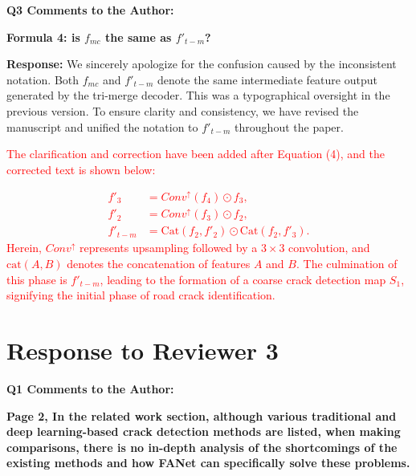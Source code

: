 \documentclass[lettersize,journal,onecolumn,12pt]{IEEEtran}
\begin{document}
{\color{BlueGreen} \textbf{Q3 Comments to the Author:}

\textbf{Formula 4: is $f_{mc}$ the same as $f'_{t-m}$?}} 

\textbf{Response:}
We sincerely apologize for the confusion caused by the inconsistent notation. 
Both $f_{mc}$ and $f'_{t-m}$ denote the same intermediate feature output generated by the tri-merge decoder. 
This was a typographical oversight in the previous version. 
To ensure clarity and consistency, we have revised the manuscript and unified the notation to $f'_{t-m}$ throughout the paper. 

\textcolor{red}{The clarification and correction have been added after Equation (4), and the corrected text is shown below:}

\textcolor{red}{
\begin{equation}
\begin{split}
    f'_3 &= Conv^ {\uparrow }(f_4)   \odot f_3, \\
    f'_2 &= Conv^ {\uparrow }(f_3)   \odot f_2, \\
    f'_{t-m} &= \text{Cat}(f_2,f'_2)  \odot \text{Cat}(f_2,f'_3).
\end{split}
\end{equation}
}
\textcolor{red}{Herein,  $Conv^ {\uparrow }$ represents upsampling followed by a $3 \times 3$ convolution, 
and $\text{cat}(A, B)$ denotes the concatenation of features $A$ and $B$. }
\textcolor{red}{The culmination of this phase is $f'_{t-m}$, leading to the formation of a coarse crack detection map $S_1$, 
signifying the initial phase of road crack identification.}\\ [10pt]




\clearpage




\section{Response to Reviewer 3}


{\color{BlueGreen} \textbf{Q1 Comments to the Author:}

\textbf{Page 2, In the related work section, although various traditional and deep learning-based crack detection methods are listed, when making comparisons, there is no in-depth analysis of the shortcomings of the existing methods and how FANet can specifically solve these problems.}}
\end{document}
